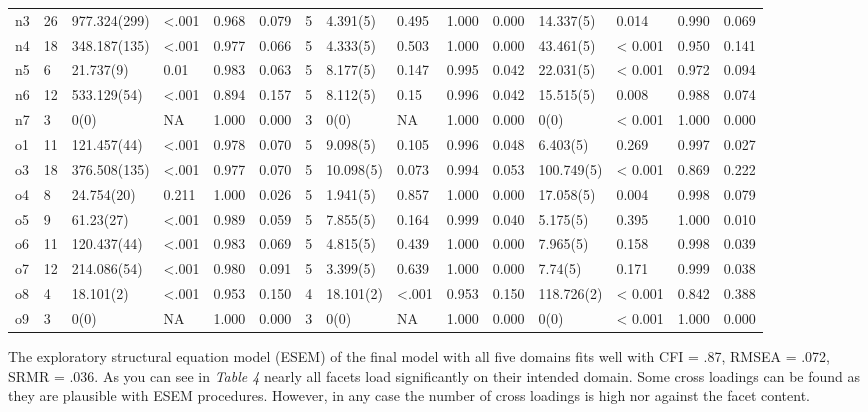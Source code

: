 \documentclass[man]{apa6}
\theoremstyle{definition}
\theoremstyle{definition}
\theoremstyle{definition}
\theoremstyle{remark}
\begin{document}
\begin{table}
{\begin{tabular}[t]{lllllllllllllll}
n3 & 26 & 977.324(299) & <.001 & 0.968 & 0.079 & 5 & 4.391(5) & 0.495 & 1.000 & 0.000 & 14.337(5) & 0.014 & 0.990 & 0.069\\
n4 & 18 & 348.187(135) & <.001 & 0.977 & 0.066 & 5 & 4.333(5) & 0.503 & 1.000 & 0.000 & 43.461(5) & < 0.001 & 0.950 & 0.141\\
n5 & 6 & 21.737(9) & 0.01 & 0.983 & 0.063 & 5 & 8.177(5) & 0.147 & 0.995 & 0.042 & 22.031(5) & < 0.001 & 0.972 & 0.094\\
n6 & 12 & 533.129(54) & <.001 & 0.894 & 0.157 & 5 & 8.112(5) & 0.15 & 0.996 & 0.042 & 15.515(5) & 0.008 & 0.988 & 0.074\\
n7 & 3 & 0(0) & NA & 1.000 & 0.000 & 3 & 0(0) & NA & 1.000 & 0.000 & 0(0) & < 0.001 & 1.000 & 0.000\\
o1 & 11 & 121.457(44) & <.001 & 0.978 & 0.070 & 5 & 9.098(5) & 0.105 & 0.996 & 0.048 & 6.403(5) & 0.269 & 0.997 & 0.027\\
o3 & 18 & 376.508(135) & <.001 & 0.977 & 0.070 & 5 & 10.098(5) & 0.073 & 0.994 & 0.053 & 100.749(5) & < 0.001 & 0.869 & 0.222\\
o4 & 8 & 24.754(20) & 0.211 & 1.000 & 0.026 & 5 & 1.941(5) & 0.857 & 1.000 & 0.000 & 17.058(5) & 0.004 & 0.998 & 0.079\\
o5 & 9 & 61.23(27) & <.001 & 0.989 & 0.059 & 5 & 7.855(5) & 0.164 & 0.999 & 0.040 & 5.175(5) & 0.395 & 1.000 & 0.010\\
o6 & 11 & 120.437(44) & <.001 & 0.983 & 0.069 & 5 & 4.815(5) & 0.439 & 1.000 & 0.000 & 7.965(5) & 0.158 & 0.998 & 0.039\\
o7 & 12 & 214.086(54) & <.001 & 0.980 & 0.091 & 5 & 3.399(5) & 0.639 & 1.000 & 0.000 & 7.74(5) & 0.171 & 0.999 & 0.038\\
o8 & 4 & 18.101(2) & <.001 & 0.953 & 0.150 & 4 & 18.101(2) & <.001 & 0.953 & 0.150 & 118.726(2) & < 0.001 & 0.842 & 0.388\\
o9 & 3 & 0(0) & NA & 1.000 & 0.000 & 3 & 0(0) & NA & 1.000 & 0.000 & 0(0) & < 0.001 & 1.000 & 0.000\\
\bottomrule
\end{tabular}}
\end{table}

The exploratory structural equation model (ESEM) of the final model with
all five domains fits well with CFI = .87, RMSEA = .072, SRMR = .036. As
you can see in \emph{Table 4} nearly all facets load significantly on
their intended domain. Some cross loadings can be found as they are
plausible with ESEM procedures. However, in any case the number of cross
loadings is high nor against the facet content.
\end{document}
